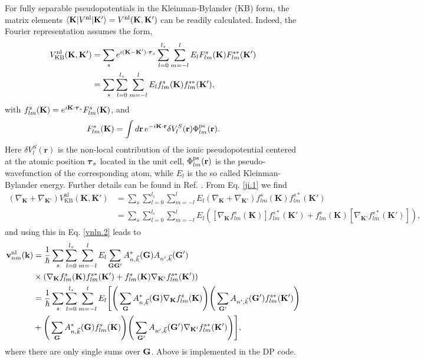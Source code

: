 \documentclass[letterpaper,aps]{revtex4}
\begin{document}
For fully  separable pseudopotentials in the  
Kleinman-Bylander (KB) form,\cite{mottaCMS10,kleinmanPRL82,adolphPRB96} 
the
matrix elements 
 $\langle \mathbf{K} |
V^\mathrm{nl}
| \mathbf{K}' \rangle
=V^\mathrm{nl}(\mathbf{K},\mathbf{K}')
$
can be readily calculated. \cite{mottaCMS10}
Indeed,
the Fourier representation assumes 
the form,\cite{adolphPRB96,gordienkoRPJ04,fuchsCPC99}
\begin{align}\label{ji.1} 
V^\mathrm{nl}_{\mathrm{KB}}(\mathbf{K},\mathbf{K}')  
 &= 
\sum_s e^{i(\mathbf{K}-\mathbf{K}')\cdot\boldsymbol{\tau}_s}
\sum_{l=0}^{l_s}\sum_{m=-l}^{l}E_lF_{lm}^s(\mathbf{K})F_{lm}^{s*}(\mathbf{K}')  
\nonumber\\
 &= 
\sum_s 
\sum_{l=0}^{l_s}\sum_{m=-l}^{l}E_lf_{lm}^s(\mathbf{K})f_{lm}^{s*}(\mathbf{K}')  
,
\end{align} 
with $f^s_{lm}(\mathbf{K})=e^{i\mathbf{K}\cdot\boldsymbol{\tau}_s}F^s_{lm}(\mathbf{K})$, and
\begin{align}\label{ji.2}
F^s_{lm}(\mathbf{K})=\int d\mathbf{r}\,e^{-i\mathbf{K}\cdot\mathbf{r}}
\delta V^S_l(\mathbf{r})
\Phi^{\mathrm{ps}}_{lm}(\mathbf{r}) 
.
\end{align}
Here $\delta V^S_l(\mathbf{r})$ is the non-local contribution of the ionic
pseudopotential centered at the atomic position $\boldsymbol{\tau}_s$ located in
the unit cell, 
$\Phi^{\mathrm{ps}}_{lm}(\mathbf{r})$ is the pseudo-wavefunction of the corresponding
atom, while $E_l$ is the so called 
Kleinman-Bylander energy. Further details can be found in
Ref. \cite{fuchsCPC99}.
From Eq. \eqref{ji.1} we find
\begin{align}\label{ji.1n}
(\nabla_\mathbf{K}+\nabla_{\mathbf{K}'})  
V^\mathrm{nl}_{\mathrm{KB}}(\mathbf{K},\mathbf{K}') 
 &= 
\sum_s 
\sum_{l=0}^{l_s}\sum_{m=-l}^{l}E_l 
(\nabla_\mathbf{K}+\nabla_{\mathbf{K}'})   
f_{lm}^s (\mathbf{K})f_{lm}^{s*}(\mathbf{K}') 
\nonumber\\
 &= 
\sum_s 
\sum_{l=0}^{l_s}\sum_{m=-l}^{l}E_l 
\left(\left[\nabla_\mathbf{K} f_{lm}^s (\mathbf{K})\right]f_{lm}^{s*}(\mathbf{K}') 
+
f_{lm}^s (\mathbf{K}) \left[\nabla_{\mathbf{K}'}  f_{lm}^{s*}(\mathbf{K}') \right]
\right),
\end{align}
and using this
 in Eq. \eqref{vnln.2} leads to
\begin{align}\label{forg}
\mathbf{v}^\mathrm{nl}_{nm}(\mathbf{k})
&=
\frac{1}{\hbar}
\sum_s
\sum_{l=0}^{l_s}\sum_{m=-l}^{l}E_l \sum_{\mathbf{G}\mathbf{G}'}
A^*_{n,\vec{k}}(\mathbf{G})A_{n',\vec{k}}(\mathbf{G}')
\nonumber\\
&\times
( \nabla_{\mathbf{K}}f_{lm}^s(\mathbf{K})f_{lm}^{s*}(\mathbf{K}') +
f_{lm}^s(\mathbf{K})\nabla_{\mathbf{K}'}f_{lm}^{s*}(\mathbf{K}') ) \nonumber\\
&
=\frac{1}{\hbar}
 \sum_s \sum_{l=0}^{l_s}\sum_{m=-l}^{l}E_l \Bigg[
\Bigg(\sum_{\mathbf{G}}A^*_{n,\vec{k}}(\mathbf{G})\nabla_{\mathbf{K}}f_{lm}^s(\mathbf{K})\Bigg)
\Bigg(\sum_{\mathbf{G}'}A_{n',\vec{k}}(\mathbf{G}')
f_{lm}^{s*}(\mathbf{K}')\Bigg) \nonumber\\
&+
\Bigg(\sum_{\mathbf{G}}A^*_{n,\vec{k}}(\mathbf{G})
f_{lm}^s(\mathbf{K})\Bigg)\Bigg
(\sum_{\mathbf{G}'}A_{n',\vec{k}}(\mathbf{G}')
\nabla_{\mathbf{K}'}f_{lm}^{s*}(\mathbf{K}')\Bigg) \Bigg]
,
\end{align}
where there are only single sums over $\mathbf{G}$. 
Above is implemented in 
the DP code.\cite{olevanoDP}
\end{document}
